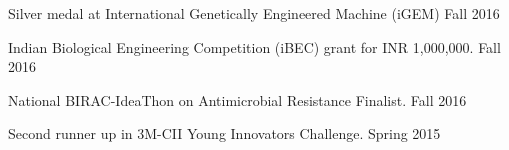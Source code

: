 Silver medal at International Genetically Engineered Machine (iGEM) \hfill Fall 2016

Indian Biological Engineering Competition (iBEC) grant for INR 1,000,000. \hfill Fall 2016

National BIRAC-IdeaThon on Antimicrobial Resistance Finalist. \hfill Fall 2016

Second runner up in 3M-CII Young Innovators Challenge. \hfill Spring 2015